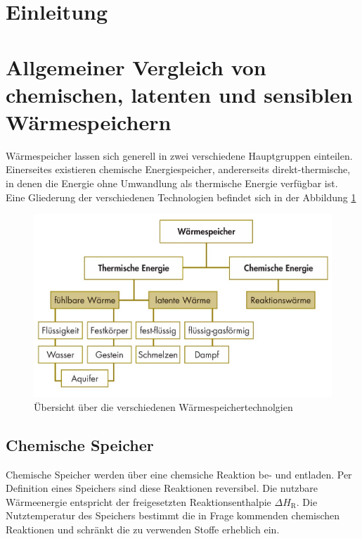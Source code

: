 \documentclass[11pt,a4paper]{scrartcl}
\begin{document}

\tableofcontents
\newpage
\renewcommand{\headrulewidth}{0.4pt}
\renewcommand{\footrulewidth}{0.4pt}
\lhead{}
\rhead{}
\cfoot{}
\setcounter{page}{1}
\cfoot{\thepage}
\section{Einleitung}
\newpage
\section{Allgemeiner Vergleich von chemischen, latenten und sensiblen
Wärmespeichern}
Wärmespeicher lassen sich generell in zwei verschiedene Hauptgruppen einteilen.
Einerseites existieren chemische Energiespeicher, andererseits
direkt-thermische, in denen die Energie ohne Umwandlung als thermische Energie
verfügbar ist. Eine Gliederung der verschiedenen Technologien befindet sich in
der Abbildung
\ref{fig:Wärmespeicher}

\begin{figure}[h]
\begin{center}
\includegraphics[scale=0.3]{images/speicher.jpg}
\caption{Übersicht über die verschiedenen Wärmespeichertechnolgien \cite{BINE1}}
\label{fig:Wärmespeicher}
\end{center}
\end{figure}

\subsection{Chemische Speicher}
Chemische Speicher werden über eine chemsiche Reaktion be- und entladen. Per
Definition eines Speichers sind diese Reaktionen reversibel. Die nutzbare
Wärmeenergie entspricht der freigesetzten Reaktionsenthalpie $\Delta
H_{\mathrm{R}}$. Die Nutztemperatur des Speichers bestimmt die in Frage
kommenden chemischen Reaktionen und schränkt die zu verwenden Stoffe erheblich
ein.
\end{document}

